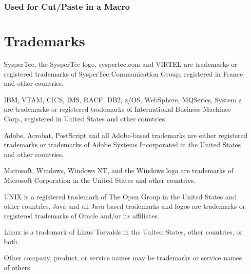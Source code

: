 \documentclass[letterpaper,10pt,english]{sphinxmanual}
\begin{document}
\subsection{Used for Cut/Paste in a Macro}
\label{\detokenize{Customization:used-for-cut-paste-in-a-macro}}
\begin{sphinxVerbatim}[commandchars=\\\{\}]
\end{sphinxVerbatim}


\chapter{Trademarks}
\label{\detokenize{Customization:trademarks}}
SysperTec, the SysperTec logo, syspertec.com and VIRTEL are trademarks or registered trademarks of SysperTec
Communication Group, registered in France and other countries.

IBM, VTAM, CICS, IMS, RACF, DB2, z/OS, WebSphere, MQSeries, System z are trademarks or registered trademarks of
International Business Machines Corp., registered in United States and other countries.

Adobe, Acrobat, PostScript and all Adobe-based trademarks are either registered trademarks or trademarks of Adobe
Systems Incorporated in the United States and other countries.

Microsoft, Windows, Windows NT, and the Windows logo are trademarks of Microsoft Corporation in the United States
and other countries.

UNIX is a registered trademark of The Open Group in the United States and other countries.
Java and all Java-based trademarks and logos are trademarks or registered trademarks of Oracle and/or its affiliates.

Linux is a trademark of Linus Torvalds in the United States, other countries, or both.

Other company, product, or service names may be trademarks or service names of others.



\renewcommand{\indexname}{Index}
\printindex
\end{document}
